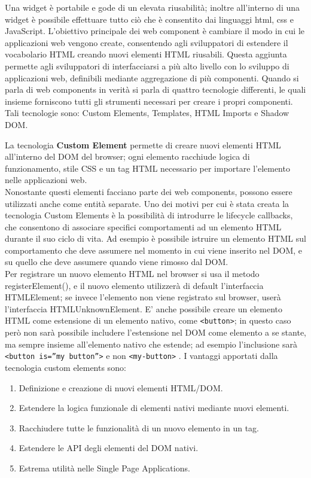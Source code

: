 Una widget è portabile e gode di un elevata riusabilità; inoltre all’interno di una widget è possibile effettuare tutto ciò che è consentito dai linguaggi html, css e JavaScript. 
L’obiettivo principale dei web component è cambiare il modo in cui le applicazioni web vengono create, consentendo agli sviluppatori di estendere il vocabolario HTML creando nuovi elementi HTML riusabili. Questa aggiunta permette agli sviluppatori di interfacciarsi a più alto livello con lo sviluppo di applicazioni web, definibili mediante aggregazione di più componenti.
Quando si parla di web components in verità si parla di quattro tecnologie differenti, le quali insieme forniscono tutti gli strumenti necessari per creare i propri componenti.
Tali tecnologie sono: Custom Elements, Templates, HTML Imports e Shadow DOM. 

La tecnologia \textbf{Custom Element} permette di creare nuovi elementi HTML all’interno del DOM del browser; ogni elemento racchiude logica di funzionamento, stile CSS e un tag HTML necessario per importare l’elemento nelle applicazioni web.
\\
Nonostante questi elementi facciano parte dei web components, possono essere utilizzati anche come entità separate. Uno dei motivi per cui è stata creata la tecnologia Custom Elements è la possibilità di introdurre le lifecycle callbacks, che consentono di associare specifici comportamenti ad un elemento HTML durante il suo ciclo di vita. Ad esempio è possibile istruire un elemento HTML sul comportamento che deve assumere nel momento in cui viene inserito nel DOM, e su quello che deve assumere quando viene rimosso dal DOM.
\\
Per registrare un nuovo elemento HTML nel browser si usa il metodo registerElement(), e il nuovo elemento utilizzerà di default l’interfaccia HTMLElement; se invece l’elemento non viene registrato sul browser, userà l’interfaccia HTMLUnknownElement. E’ anche possibile creare un elemento HTML come estensione di un elemento nativo, come \texttt{<button>}; in questo caso però non sarà possibile includere l’estensione nel DOM come elemento a se stante, ma sempre insieme all’elemento nativo che estende; ad esempio l’inclusione sarà \texttt{<button is=”my button”>} e non \texttt{<my-button>} .
I vantaggi apportati dalla tecnologia custom elements sono:
\begin{enumerate}
\item Definizione e creazione di nuovi elementi HTML/DOM.
\item Estendere la logica funzionale di elementi nativi mediante nuovi elementi.
\item Racchiudere tutte le funzionalità di un nuovo elemento in un tag.
\item Estendere le API degli elementi del DOM nativi.
\item Estrema utilità nelle Single Page Applications.
\end{enumerate}
